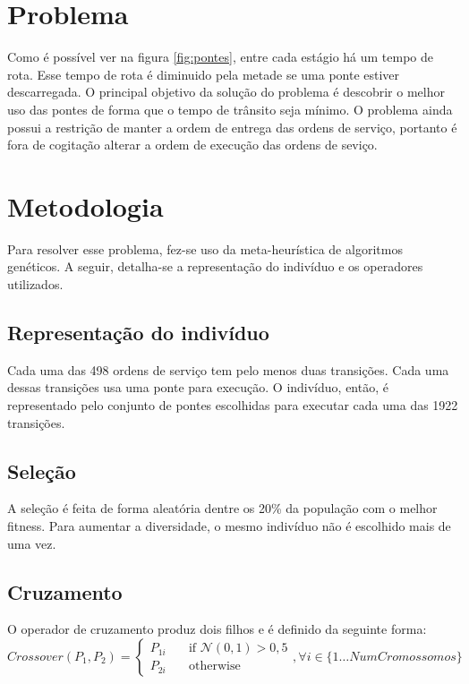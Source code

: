 \documentclass[11pt]{article}
\begin{document}
\section{Problema}

Como é possível ver na figura \ref{fig:pontes}, entre cada estágio há um tempo
de rota. Esse tempo de rota é diminuido pela metade se uma ponte estiver
descarregada. O principal objetivo da solução do problema é descobrir o melhor
uso das pontes de forma que o tempo de trânsito seja mínimo. O problema ainda
possui a restrição de manter a ordem de entrega das ordens de serviço, portanto
é fora de cogitação alterar a ordem de execução das ordens de seviço.

\section{Metodologia}

Para resolver esse problema, fez-se uso da meta-heurística de algoritmos
genéticos. A seguir, detalha-se a representação do indivíduo e os operadores utilizados.

\subsection{Representação do indivíduo}

Cada uma das 498 ordens de serviço tem pelo menos duas transições. Cada uma
dessas transições usa uma ponte para execução. O indivíduo, então, é
representado pelo conjunto de pontes escolhidas para executar cada uma das 1922
transições.

\subsection{Seleção}

A seleção é feita de forma aleatória dentre os 20\% da população com o melhor
fitness. Para aumentar a diversidade, o mesmo indivíduo  não é escolhido mais
de uma vez.

\subsection{Cruzamento}

O operador de cruzamento produz dois filhos e é definido da seguinte forma:
\begin{equation}
    Crossover(P_1, P_2) = 
    \begin{cases}
        P_{1i} & \quad \text{if } \mathcal{N}(0,1) > 0,5\\
        P_{2i} & \quad \text{otherwise}
    \end{cases}
    ,\forall i \in \{1\dots NumCromossomos\}
\end{equation}
\end{document}
